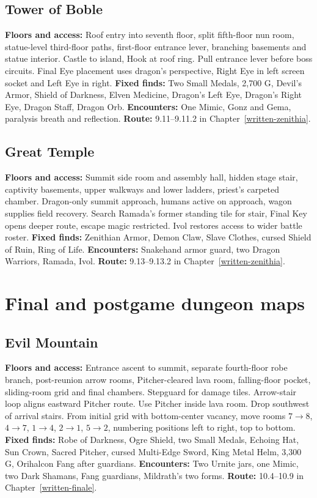 \subsection{Tower of Boble}
\label{atlas-boble}
\textbf{Floors and access:} Roof entry into seventh floor, split fifth-floor nun room, statue-level third-floor paths, first-floor entrance lever, branching basements and statue interior. Castle to island, Hook at roof ring. Pull entrance lever before boss circuits. Final Eye placement uses dragon's perspective, Right Eye in left screen socket and Left Eye in right. \textbf{Fixed finds:} Two Small Medals, 2,700 G, Devil's Armor, Shield of Darkness, Elven Medicine, Dragon's Left Eye, Dragon's Right Eye, Dragon Staff, Dragon Orb. \textbf{Encounters:} One Mimic, Gonz and Gema, paralysis breath and reflection. \textbf{Route:} 9.11--9.11.2 in Chapter~\ref{written-zenithia}.

\subsection{Great Temple}
\label{atlas-great-temple}
\textbf{Floors and access:} Summit side room and assembly hall, hidden stage stair, captivity basements, upper walkways and lower ladders, priest's carpeted chamber. Dragon-only summit approach, humans active on approach, wagon supplies field recovery. Search Ramada's former standing tile for stair, Final Key opens deeper route, escape magic restricted. Ivol restores access to wider battle roster. \textbf{Fixed finds:} Zenithian Armor, Demon Claw, Slave Clothes, cursed Shield of Ruin, Ring of Life. \textbf{Encounters:} Snakehand armor guard, two Dragon Warriors, Ramada, Ivol. \textbf{Route:} 9.13--9.13.2 in Chapter~\ref{written-zenithia}.

\section{Final and postgame dungeon maps}
\subsection{Evil Mountain}
\label{atlas-evil-mountain}
\textbf{Floors and access:} Entrance ascent to summit, separate fourth-floor robe branch, post-reunion arrow rooms, Pitcher-cleared lava room, falling-floor pocket, sliding-room grid and final chambers. Stepguard for damage tiles. Arrow-stair loop aligns eastward Pitcher route. Use Pitcher inside lava room. Drop southwest of arrival stairs. From initial grid with bottom-center vacancy, move rooms $7\rightarrow8$, $4\rightarrow7$, $1\rightarrow4$, $2\rightarrow1$, $5\rightarrow2$, numbering positions left to right, top to bottom. \textbf{Fixed finds:} Robe of Darkness, Ogre Shield, two Small Medals, Echoing Hat, Sun Crown, Sacred Pitcher, cursed Multi-Edge Sword, King Metal Helm, 3,300 G, Orihalcon Fang after guardians. \textbf{Encounters:} Two Urnite jars, one Mimic, two Dark Shamans, Fang guardians, Mildrath's two forms. \textbf{Route:} 10.4--10.9 in Chapter~\ref{written-finale}.

